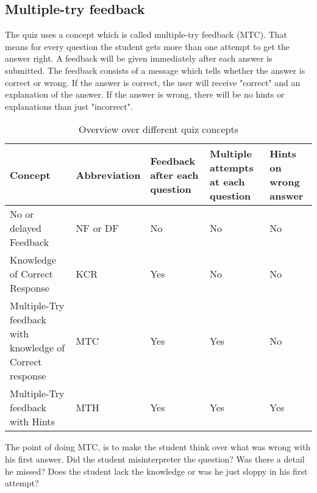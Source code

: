 \subsection{Multiple-try feedback}
The quiz uses a concept which is called multiple-try feedback (MTC). That means for every question the student gets more than one attempt to get the answer right. A feedback will be given immediately after each answer is submitted. The feedback consists of a message which tells whether the answer is correct or wrong. If the answer is correct, the user will receive "correct" and an explanation of the answer. If the answer is wrong, there will be no hints or explanations than just "incorrect".

\begin{table}[h!]
\begin{tabular}{ | m{7em} | m{6em}| m{5em} | m{5em} | m{5em} | } 
	\hline
	\textbf{Concept} & \textbf{Abbreviation} & \textbf{Feedback after each question} & \textbf{Multiple attempts at each question} & \textbf{Hints on wrong answer} \\ [0.5ex]
	\hline
No or delayed Feedback & NF or DF & No & No & No  \\
\hline
Knowledge of Correct Response & KCR  & Yes & No & No \\
\hline
Multiple-Try feedback with knowledge of Correct response  & MTC & Yes & Yes & No \\
\hline
Multiple-Try feedback with Hints & MTH & Yes & Yes & Yes \\
\hline
\end{tabular}
\caption{Overview over different quiz concepts}
\end{table}

The point of doing MTC, is to make the student think over what was wrong with his first answer. Did the student misinterpreter the question? Was there a detail he missed? Does the student lack the knowledge or was he just sloppy in his first attempt?

